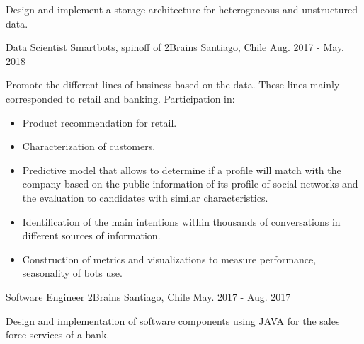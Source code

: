 \begin{cventries}
{\begin{cvitems}
        \item {Design and implement a storage architecture for heterogeneous and unstructured data.}
      \end{cvitems}
    }
  \cventry
    {Data Scientist} %
    {Smartbots, spinoff of 2Brains} %
    {Santiago, Chile} %
    {Aug. 2017 - May. 2018} %
    {
      \begin{cvitems} %
        \item {Promote the different lines of business based on the data. These lines mainly corresponded to retail and banking. Participation in:}
      	\begin{itemize}
        	\item{Product recommendation for retail.}
        	\item{Characterization of customers.}
        	\item{Predictive model that allows to determine if a profile will match with the company based on the public information of its profile of social networks and the evaluation to candidates with similar characteristics.}
        	\item{Identification of the main intentions within thousands of conversations in different sources of information.}
        	\item{Construction of metrics and visualizations to measure performance, seasonality of bots use.}
      	\end{itemize}
      \end{cvitems}
    }

  \cventry
    {Software Engineer} %
    {2Brains} %
    {Santiago, Chile} %
    {May. 2017 - Aug. 2017} %
    {
      \begin{cvitems} %
        \item {Design and implementation of software components using JAVA for the sales force services of a bank.}
      \end{cvitems}
    }


\end{cventries}
